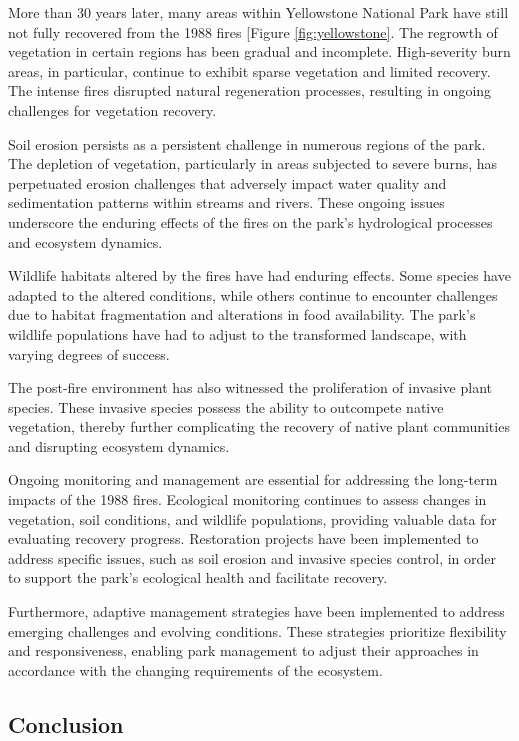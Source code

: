 \documentclass[
  12 pt,
]{Nemilov}
\begin{document}
More than 30 years later, many areas within Yellowstone National Park have still not fully recovered from the 1988 fires {[}Figure \ref{fig:yellowstone}\citep{li2022analyzing, nasa-yellowstone, romme2004ten, romme2011twenty}. The regrowth of vegetation in certain regions has been gradual and incomplete. High-severity burn areas, in particular, continue to exhibit sparse vegetation and limited recovery. The intense fires disrupted natural regeneration processes, resulting in ongoing challenges for vegetation recovery.

Soil erosion persists as a persistent challenge in numerous regions of the park. The depletion of vegetation, particularly in areas subjected to severe burns, has perpetuated erosion challenges that adversely impact water quality and sedimentation patterns within streams and rivers. These ongoing issues underscore the enduring effects of the fires on the park's hydrological processes and ecosystem dynamics.

Wildlife habitats altered by the fires have had enduring effects. Some species have adapted to the altered conditions, while others continue to encounter challenges due to habitat fragmentation and alterations in food availability. The park's wildlife populations have had to adjust to the transformed landscape, with varying degrees of success.

The post-fire environment has also witnessed the proliferation of invasive plant species. These invasive species possess the ability to outcompete native vegetation, thereby further complicating the recovery of native plant communities and disrupting ecosystem dynamics.

Ongoing monitoring and management are essential for addressing the long-term impacts of the 1988 fires. Ecological monitoring continues to assess changes in vegetation, soil conditions, and wildlife populations, providing valuable data for evaluating recovery progress. Restoration projects have been implemented to address specific issues, such as soil erosion and invasive species control, in order to support the park's ecological health and facilitate recovery.

Furthermore, adaptive management strategies have been implemented to address emerging challenges and evolving conditions. These strategies prioritize flexibility and responsiveness, enabling park management to adjust their approaches in accordance with the changing requirements of the ecosystem.

\subsection{Conclusion}\label{conclusion}
\end{document}
